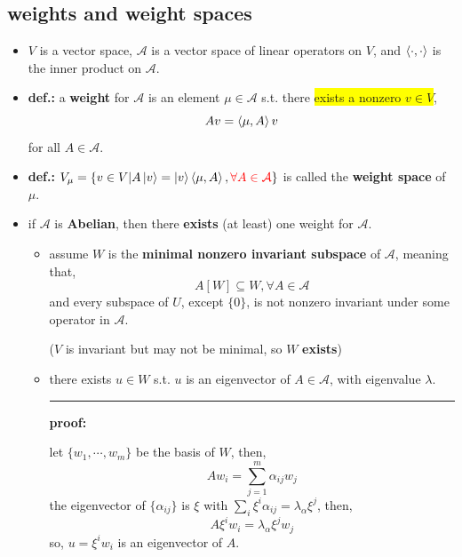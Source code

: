 \subsection{weights and weight spaces}
\begin{itemize}
	\item $V$ is a vector space, $\mathcal{A}$ is a vector space of linear operators on $V$, and $\braket{\cdot, \cdot}$ is the inner product on $\mathcal{A}$.
	
	\item \textbf{def.:} a \textbf{weight} for $\mathcal{A}$ is an element $\mu \in \mathcal{A}$ s.t. there \colorbox{yellow}{exists a nonzero $v \in V$},
	\begin{equation}
		A v = \braket{\mu, A} v
	\end{equation}
	for all $A \in \mathcal{A}$.
	
	\item \textbf{def.:} $V_\mu = \{v \in V | A \ket{v} = \ket{v} \braket{\mu, A}, \mathcolor{red}{\forall A \in \mathcal{A}}\}$ is called the \textbf{weight space} of $\mu$.
	
	\item if $\mathcal{A}$ is \textbf{Abelian}, then there \textbf{exists} (at least) one weight for $\mathcal{A}$.
	
	\begin{tcolorbox}[title=proof:]
		\begin{itemize}
			\item assume $W$ is the \textbf{minimal nonzero invariant subspace} of $\mathcal{A}$, meaning that,
			\begin{equation}
				A[W] \subseteq W, \forall A \in \mathcal{A}
			\end{equation}
			and every subspace of $U$, except $\{0\}$, is not nonzero invariant under some operator in $\mathcal{A}$.
			
			($V$ is invariant but may not be minimal, so $W$ \textbf{exists})
			
			\item there exists $u \in W$ s.t. $u$ is an eigenvector of $A \in \mathcal{A}$, with eigenvalue $\lambda$.
			
			\noindent\rule[0.5ex]{\linewidth}{0.5pt} %
			
			\textbf{proof:}
			
			let $\{w_1, \cdots, w_m\}$ be the basis of $W$, then,
			\begin{equation}
				A w_i = \sum_{j = 1}^m \alpha_{i j} w_j
			\end{equation}
			the eigenvector of $\{\alpha_{i j}\}$ is $\xi$ with $\sum_i \xi^i \alpha_{i j} = \lambda_\alpha \xi^j$, then,
			\begin{equation}
				A \xi^i w_i = \lambda_\alpha \xi^j w_j
			\end{equation}
			so, $u = \xi^i w_i$ is an eigenvector of $A$.
			

\end{itemize}
\end{tcolorbox}
\end{itemize}
